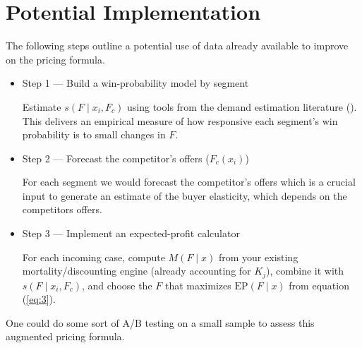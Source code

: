 \documentclass[12pt]{article}
\theoremstyle{plain}
\theoremstyle{plain}
\begin{document}
\section{Potential Implementation}\label{sec:3} 


The following steps outline a potential use of data already available to improve on the pricing formula. 

\begin{itemize}
    \item Step 1 — Build a win-probability model by segment

    Estimate $s(F\mid x_i, F_c)$ using tools from the demand estimation literature (\cite{berry_automobile_1995}).  This delivers an empirical measure of how responsive each segment’s win probability is to small changes in $F$.

    \item Step 2 — Forecast the competitor's offers ($F_c(x_i)$)

    For each segment we would forecast the competitor's offers which is a crucial input to generate an estimate of the buyer elasticity, which depends on the competitors offers. 

    \item Step 3 — Implement an expected-profit calculator

    For each incoming case, compute $M(F\mid x)$ from your existing mortality/discounting engine (already accounting for $K_j$), combine it with $s(F\mid x_i, F_c)$, and choose the $F$ that maximizes $\text{EP}(F\mid x)$ from equation (\ref{eq:3}).
\end{itemize}

One could do some sort of A/B testing on a small sample to assess this augmented pricing formula. 

 

 
 
\end{document}
